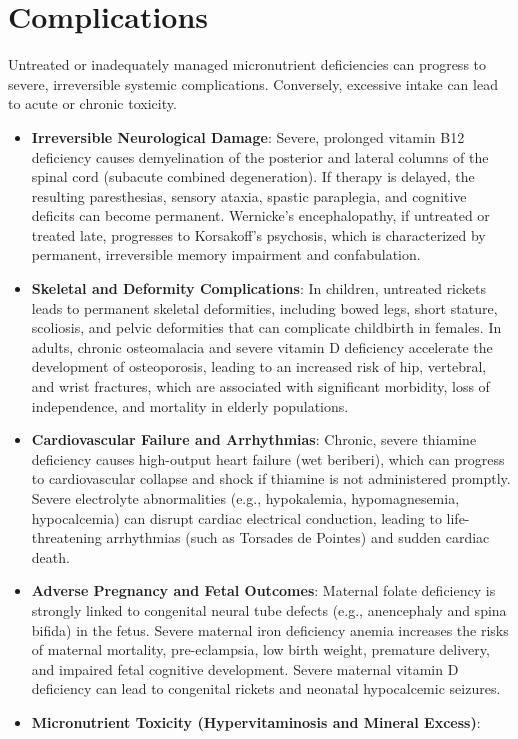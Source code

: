 \section*{Complications}
Untreated or inadequately managed micronutrient deficiencies can progress to severe, irreversible systemic complications. Conversely, excessive intake can lead to acute or chronic toxicity.
\begin{itemize}
\item \textbf{Irreversible Neurological Damage}: Severe, prolonged vitamin B12 deficiency causes demyelination of the posterior and lateral columns of the spinal cord (subacute combined degeneration). If therapy is delayed, the resulting paresthesias, sensory ataxia, spastic paraplegia, and cognitive deficits can become permanent. Wernicke's encephalopathy, if untreated or treated late, progresses to Korsakoff's psychosis, which is characterized by permanent, irreversible memory impairment and confabulation.
\item \textbf{Skeletal and Deformity Complications}: In children, untreated rickets leads to permanent skeletal deformities, including bowed legs, short stature, scoliosis, and pelvic deformities that can complicate childbirth in females. In adults, chronic osteomalacia and severe vitamin D deficiency accelerate the development of osteoporosis, leading to an increased risk of hip, vertebral, and wrist fractures, which are associated with significant morbidity, loss of independence, and mortality in elderly populations.
\item \textbf{Cardiovascular Failure and Arrhythmias}: Chronic, severe thiamine deficiency causes high-output heart failure (wet beriberi), which can progress to cardiovascular collapse and shock if thiamine is not administered promptly. Severe electrolyte abnormalities (e.g., hypokalemia, hypomagnesemia, hypocalcemia) can disrupt cardiac electrical conduction, leading to life-threatening arrhythmias (such as Torsades de Pointes) and sudden cardiac death.
\item \textbf{Adverse Pregnancy and Fetal Outcomes}: Maternal folate deficiency is strongly linked to congenital neural tube defects (e.g., anencephaly and spina bifida) in the fetus. Severe maternal iron deficiency anemia increases the risks of maternal mortality, pre-eclampsia, low birth weight, premature delivery, and impaired fetal cognitive development. Severe maternal vitamin D deficiency can lead to congenital rickets and neonatal hypocalcemic seizures.
\item \textbf{Micronutrient Toxicity (Hypervitaminosis and Mineral Excess)}:

\end{itemize}

